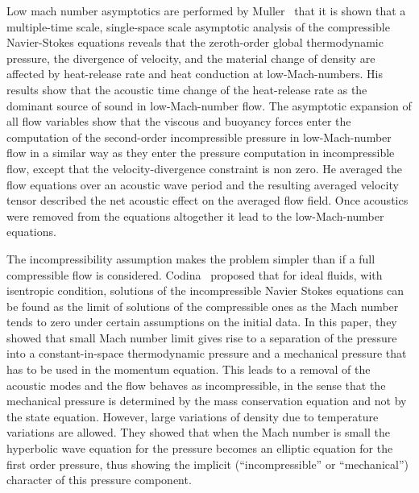 Low mach number  asymptotics are performed by Muller~\cite{Muller} that it is shown that a multiple-time scale,
single-space scale asymptotic analysis of the compressible
Navier-Stokes equations reveals that the zeroth-order global
thermodynamic pressure, the divergence of velocity, and the material
change of density are affected by heat-release rate and heat
conduction at low-Mach-numbers. His results show that the acoustic time change of the
heat-release rate as the dominant source of sound in low-Mach-number
flow. The asymptotic expansion of all flow variables show that the
viscous and buoyancy forces enter the computation of the second-order
incompressible pressure in low-Mach-number flow in a similar way as
they enter the pressure computation in incompressible flow, except
that the velocity-divergence constraint is non zero. He averaged the flow
equations over an acoustic wave period and the resulting averaged velocity tensor
described the net acoustic effect on the averaged flow field. Once
acoustics were removed from the equations altogether it lead to the
low-Mach-number equations.

\bigskip
 The incompressibility assumption makes the problem simpler
than if a full compressible flow is considered. Codina~\cite{Codina}
proposed that for ideal fluids, with isentropic condition, solutions
of the incompressible Navier Stokes equations can be found as the
limit of solutions of the compressible ones as the Mach number tends
to zero under certain assumptions on the initial data. In this paper, 
they showed that small Mach number limit
gives rise to a separation of the pressure into a constant-in-space
thermodynamic pressure and a mechanical pressure that has to be used
in the momentum equation. This leads to a removal of the acoustic
modes and the flow behaves as incompressible, in the sense that the
mechanical pressure is determined by the mass conservation equation
and not by the state equation. However, large variations of density
due to temperature variations are allowed. They showed that when the
Mach number is small the hyperbolic wave equation for the pressure
becomes an elliptic equation for the first order pressure, thus
showing the implicit (“incompressible” or “mechanical”) character of
this pressure component.



